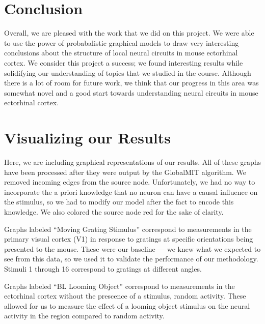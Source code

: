 \documentclass{article}
\begin{document}
\section{Conclusion}

Overall, we are pleased with the work that we did on this project. We were 
able to use the power of probabalistic graphical models to draw very 
interesting conclusions about the structure of local neural circuits in mouse 
ectorhinal cortex. We consider this project a success; we found interesting 
results while solidifying our understanding of topics that we studied in the 
course. Although there is a lot of room for future work, we think that our 
progress in this area was somewhat novel and a good start towards 
understanding neural circuits in mouse ectorhinal cortex. \par




\newpage
\appendix
\section{Visualizing our Results}

Here, we are including graphical representations of our results. All of these 
graphs have been processed after they were output by the GlobalMIT algorithm. 
We removed incoming edges from the source node. Unfortunately, we had no way 
to incorporate the a priori knowledge that no neuron can have a causal 
influence on the stimulus, so we had to modify our model after the fact to 
encode this knowledge. We also colored the source node red for the sake of 
clarity. \par

Graphs labeled ``Moving Grating Stimulus'' correspond to measurements in the 
primary visual cortex (V1) in response to gratings at specific orientations 
being presented to the mouse. These were our baseline --- we knew what we 
expected to see from this data, so we used it to validate the performance of 
our methodology. Stimuli 1 through 16 correspond to gratings at different 
angles. \par

Graphs labeled ``BL Looming Object'' correspond to measurements in the 
ectorhinal cortex without the prescence of a stimulus, random activity. These 
allowed for us to measure the effect of a looming object stimulus on the 
neural activity in the region compared to random activity. \par
\end{document}
